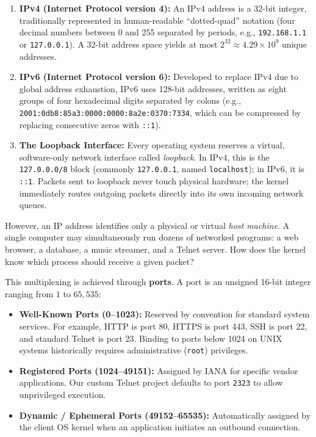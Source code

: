 \begin{enumerate}[leftmargin=2em]
    \item \textbf{IPv4 (Internet Protocol version 4):} An IPv4 address is a 32-bit integer, traditionally represented in human-readable ``dotted-quad'' notation (four decimal numbers between 0 and 255 separated by periods, e.g., \texttt{192.168.1.1} or \texttt{127.0.0.1}). A 32-bit address space yields at most $2^{32} \approx 4.29 \times 10^9$ unique addresses.
    \item \textbf{IPv6 (Internet Protocol version 6):} Developed to replace IPv4 due to global address exhaustion, IPv6 uses 128-bit addresses, written as eight groups of four hexadecimal digits separated by colons (e.g., \texttt{2001:0db8:85a3:0000:0000:8a2e:0370:7334}, which can be compressed by replacing consecutive zeros with \texttt{::1}).
    \item \textbf{The Loopback Interface:} Every operating system reserves a virtual, software-only network interface called \textit{loopback}. In IPv4, this is the \texttt{127.0.0.0/8} block (commonly \texttt{127.0.0.1}, named \texttt{localhost}); in IPv6, it is \texttt{::1}. Packets sent to loopback never touch physical hardware; the kernel immediately routes outgoing packets directly into its own incoming network queues.
\end{enumerate}

However, an IP address identifies only a physical or virtual \textit{host machine}. A single computer may simultaneously run dozens of networked programs: a web browser, a database, a music streamer, and a Telnet server. How does the kernel know which process should receive a given packet?

This multiplexing is achieved through \textbf{ports}. A port is an unsigned 16-bit integer ranging from $1$ to $65,535$:
\begin{itemize}[leftmargin=1.5em]
    \item \textbf{Well-Known Ports (0--1023):} Reserved by convention for standard system services. For example, HTTP is port 80, HTTPS is port 443, SSH is port 22, and standard Telnet is port 23. Binding to ports below 1024 on UNIX systems historically requires administrative (\texttt{root}) privileges.
    \item \textbf{Registered Ports (1024--49151):} Assigned by IANA for specific vendor applications. Our custom Telnet project defaults to port \texttt{2323} to allow unprivileged execution.
    \item \textbf{Dynamic / Ephemeral Ports (49152--65535):} Automatically assigned by the client OS kernel when an application initiates an outbound connection.
\end{itemize}

